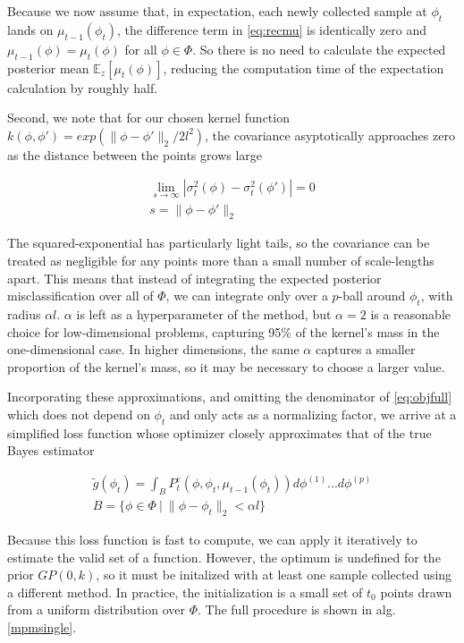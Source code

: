 \documentclass[letterpaper, 10 pt, conference]{ieeeconf}  %
\begin{document}
Because we now assume that, in expectation, each newly collected sample at $\phi_t$ lands on $\mu_{t-1}(\phi_t)$, the difference term in \eqref{eq:recmu} is identically zero and $\mu_{t-1}(\phi)=\mu_t(\phi)$ for all $\phi\in\Phi$. So there is no need to calculate the expected posterior mean $\mathbb{E}_z[\mu_t(\phi)]$, reducing the computation time of the expectation calculation by roughly half.

Second, we note that for our chosen kernel function $k(\phi,\phi')=exp(\|\phi-\phi'\|_2/2l^2)$, the covariance asyptotically approaches zero as the distance between the points grows large

\begin{align}
    \lim_{s\rightarrow\infty} |\sigma_t^2(\phi)-\sigma_t^2(\phi')|=0 \\
    s = \|\phi-\phi'\|_2 \nonumber
\end{align}

The squared-exponential has particularly light tails, so the covariance can be treated as negligible for any points more than a small number of scale-lengths apart. This means that instead of integrating the expected posterior misclassification over all of $\Phi$, we can integrate only over a $p$-ball around $\phi_t$, with radius $\alpha l$. $\alpha$ is left as a hyperparameter of the method, but $\alpha=2$ is a reasonable choice for low-dimensional problems, capturing 95\% of the kernel's mass in the one-dimensional case. In higher dimensions, the same $\alpha$ captures a smaller proportion of the kernel's mass, so it may be necessary to choose a larger value.

Incorporating these approximations, and omitting the denominator of \eqref{eq:objfull} which does not depend on $\phi_t$ and only acts as a normalizing factor, we arrive at a simplified loss function whose optimizer closely approximates that of the true Bayes estimator

\begin{align}
    \label{eq:objapprox}
    \tilde{g}(\phi_t)=\int_B P_t^e(\phi,\phi_t,\mu_{t-1}(\phi_t))d\phi^{(1)}...d\phi^{(p)} \\
    B = \{\phi\in\Phi\ |\ \|\phi-\phi_t\|_2<\alpha l\} \nonumber
\end{align}

Because this loss function is fast to compute, we can apply it iteratively to estimate the valid set of a function. However, the optimum is undefined for the prior $GP(0,k)$, so it must be initalized with at least one sample collected using a different method. In practice, the initialization is a small set of $t_0$ points drawn from a uniform distribution over $\Phi$. The full procedure is shown in alg. \ref{mpmsingle}.
\end{document}

